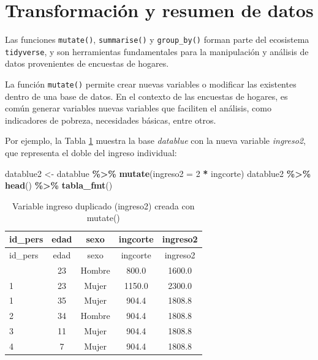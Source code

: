 \documentclass[
  spanish,
  12pt,
]{book}
\newenvironment{Shaded}{\begin{snugshade}}{\end{snugshade}}
\newcommand{\AttributeTok}[1]{\textcolor[rgb]{0.13,0.29,0.53}{#1}}
\newcommand{\DecValTok}[1]{\textcolor[rgb]{0.00,0.00,0.81}{#1}}
\newcommand{\FunctionTok}[1]{\textcolor[rgb]{0.13,0.29,0.53}{\textbf{#1}}}
\newcommand{\NormalTok}[1]{#1}
\newcommand{\OtherTok}[1]{\textcolor[rgb]{0.56,0.35,0.01}{#1}}
\newcommand{\SpecialCharTok}[1]{\textcolor[rgb]{0.81,0.36,0.00}{\textbf{#1}}}
\begin{document}
\section{Transformación y resumen de datos}\label{transformaciuxf3n-y-resumen-de-datos}

Las funciones \texttt{mutate()}, \texttt{summarise()} y \texttt{group\_by()} forman parte del ecosistema \texttt{tidyverse}, y son herramientas fundamentales para la manipulación y análisis de datos provenientes de encuestas de hogares.

La función \texttt{mutate()} permite crear nuevas variables o modificar las existentes dentro de una base de datos. En el contexto de las encuestas de hogares, es común generar variables nuevas variables que faciliten el análisis, como indicadores de pobreza, necesidades básicas, entre otros.

Por ejemplo, la Tabla \ref{tab:tab-mutate-ingreso2} muestra la base \emph{datablue} con la nueva variable \emph{ingreso2}, que representa el doble del ingreso individual:

\begin{Shaded}
\begin{Highlighting}[]
\NormalTok{datablue2 }\OtherTok{\textless{}{-}}\NormalTok{ datablue }\SpecialCharTok{\%\textgreater{}\%}
  \FunctionTok{mutate}\NormalTok{(}\AttributeTok{ingreso2 =} \DecValTok{2} \SpecialCharTok{*}\NormalTok{ ingcorte)}
\NormalTok{datablue2 }\SpecialCharTok{\%\textgreater{}\%} \FunctionTok{head}\NormalTok{() }\SpecialCharTok{\%\textgreater{}\%}
  \FunctionTok{tabla\_fmt}\NormalTok{()}
\end{Highlighting}
\end{Shaded}

\begin{longtable}[]{@{}lcccc@{}}
\caption{\label{tab:tab-mutate-ingreso2}Variable ingreso duplicado (ingreso2) creada con mutate()}\tabularnewline
\toprule\noalign{}
id\_pers & edad & sexo & ingcorte & ingreso2 \\
\midrule\noalign{}
\endfirsthead
\toprule\noalign{}
id\_pers & edad & sexo & ingcorte & ingreso2 \\
\midrule\noalign{}
\endhead
\bottomrule\noalign{}
\endlastfoot
1 & 23 & Hombre & 800.0 & 1600.0 \\
1 & 23 & Mujer & 1150.0 & 2300.0 \\
1 & 35 & Mujer & 904.4 & 1808.8 \\
2 & 34 & Hombre & 904.4 & 1808.8 \\
3 & 11 & Mujer & 904.4 & 1808.8 \\
4 & 7 & Mujer & 904.4 & 1808.8 \\
\end{longtable}
\end{document}
